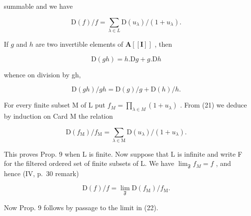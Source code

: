 summable and we have

\[
\mathrm{D} (f) / f = \sum_ {\lambda \in L} \mathrm{D} (u _ {\lambda}) / (1 + u _ {\lambda}).\tag{20}
\]

If \(g\) and \(h\) are two invertible elements of \(\mathbf{A}[[\mathbf{I}]]\) , then

\[
\mathrm{D} (g h) = h. \mathrm{D} g + g. \mathrm{D} h
\]

whence on division by gh,

\[
\mathrm{D} (g h) / g h = \mathrm{D} (g) / g + \mathrm{D} (h) / h.\tag{21}
\]

For every finite subset M of L put \(f_{M} = \prod_{\lambda \in M} (1 + u_{\lambda})\) . From (21) we deduce by induction on Card M the relation

\[
\mathrm{D} \left(f _ {\mathrm{M}}\right) / f _ {\mathrm{M}} = \sum_ {\lambda \in \mathrm{M}} \mathrm{D} \left(u _ {\lambda}\right) / \left(1 + u _ {\lambda}\right).\tag{22}
\]

This proves Prop. 9 when L is finite. Now suppose that L is infinite and write F for the filtered ordered set of finite subsets of L. We have \(\lim_{\mathfrak{F}} f_{M} = f\) , and hence (IV, p.~30 remark)

\[
\mathrm{D} (f) / f = \lim _ {\mathfrak {F}} \mathrm{D} (f _ {\mathrm{M}}) / f _ {\mathrm{M}}.
\]

Now Prop. 9 follows by passage to the limit in (22).

